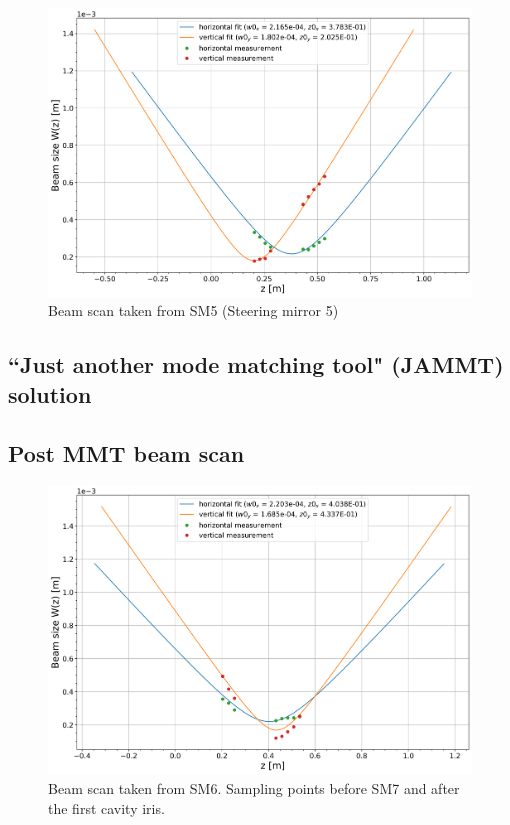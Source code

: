 \begin{figure}[H]
\includegraphics[width=\textwidth]{figs/ALGAAS/beamscans/12_18_2020_preMMT.png}
\caption{Beam scan taken from SM5 (Steering mirror 5)}
\label{fig:macor_mount_design}
\end{figure}


\subsection{``Just another mode matching tool" (JAMMT) solution}


\subsection{Post MMT beam scan}

\begin{figure}[H]
\includegraphics[width=\textwidth]{figs/ALGAAS/beamscans/01_12_2021_postMMT.png}
\caption{Beam scan taken from SM6. Sampling points before SM7 and after the first cavity iris.}
\label{fig:macor_mount_design}
\end{figure}


